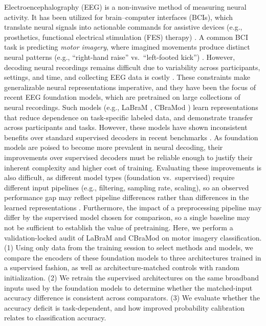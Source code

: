 \documentclass[conference]{IEEEtran}
\begin{document}
Electroencephalography (EEG) is a non-invasive method of measuring neural activity. It has been utilized for brain--computer interfaces (BCIs), which translate neural signals into actionable commands for assistive devices (e.g., prosthetics, functional electrical stimulation (FES) therapy) \cite{lotte2018review}. A common BCI task is predicting \emph{motor imagery}, where imagined movements produce distinct neural patterns (e.g., ``right-hand raise'' vs.\ ``left-footed kick'') \cite{pfurtscheller1999erd,lotte2018review}. However, decoding neural recordings remains difficult due to variability across participants, settings, and time, and collecting EEG data is costly \cite{lotte2018review,brunner2024bcifes}.
These constraints make generalizable neural representations imperative, and they have been the focus of recent EEG foundation models, which are pretrained on large collections of neural recordings. Such models (e.g., LaBraM \cite{jiang2024labram}, CBraMod \cite{wang2025cbramod}) learn representations that reduce dependence on task-specific labeled data, and demonstrate transfer across participants and tasks. However, these models have shown inconsistent benefits over standard supervised decoders in recent benchmarks \cite{kontras2026neuroatlas,zare2026negativecontrol}. As foundation models are poised to become more prevalent in neural decoding, their improvements over supervised decoders must be reliable enough to justify their inherent complexity and higher cost of training.
Evaluating these improvements is also difficult, as different model types (foundation vs.\ supervised) require different input pipelines (e.g., filtering, sampling rate, scaling), so an observed performance gap may reflect pipeline differences rather than differences in the learned representations \cite{kontras2026neuroatlas}. Furthermore, the impact of a preprocessing pipeline may differ by the supervised model chosen for comparison, so a single baseline may not be sufficient to establish the value of pretraining.
Here, we perform a validation-locked audit of LaBraM and CBraMod on motor imagery classification. (1) Using only data from the training session to select methods and models, we compare the encoders of these foundation models to three architectures trained in a supervised fashion, as well as architecture-matched controls with random initialization. (2) We retrain the supervised architectures on the same broadband inputs used by the foundation models to determine whether the matched-input accuracy difference is consistent across comparators. (3) We evaluate whether the accuracy deficit is task-dependent, and how improved probability calibration relates to classification accuracy.
\end{document}
